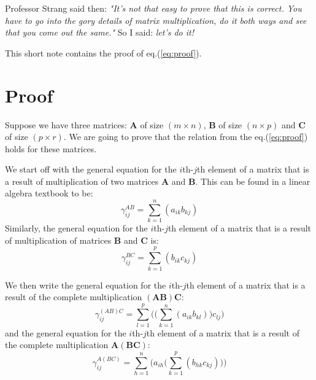 \documentclass[10pt,twocolumn]{article}
\begin{document}
Professor Strang said then: \textit{"It's not that easy to prove that this is correct. You have to go into the gory details of matrix multiplication, do it both ways and see that you come out the same."} So I said: \textit{let's do it!}

This short note contains the proof of eq.(\ref{eq:proof}).

\section*{Proof}

Suppose we have three matrices: $\bm{A}$ of size $(m \times n)$, $\bm{B}$ of size $(n \times p)$ and $\bm{C}$ of size $(p \times r)$. We are going to prove that the relation from the eq.(\ref{eq:proof}) holds for these matrices.

We start off with the general equation for the $i$th-$j$th element of a matrix that is a result of multiplication of two matrices $\bm{A}$ and $\bm{B}$. This can be found in a linear algebra textbook to be:
\begin{equation}
\gamma_{ij}^{AB} = \sum_{k=1}^{n} (a_{ik} b_{kj})
\end{equation}
Similarly, the general equation for the $i$th-$j$th element of a matrix that is a result of multiplication of matrices $\bm{B}$ and $\bm{C}$ is:
\begin{equation}
\gamma_{ij}^{BC} = \sum_{k=1}^{p} (b_{ik} c_{kj})
\end{equation}

We then write the general equation for the $i$th-$j$th element of a matrix that is a result of the complete multiplication $(\bm{A} \bm{B}) \bm{C}$:
\begin{equation} \label{eq:ab_c}
\gamma_{ij}^{(AB)C} = \sum_{l=1}^{p} \Big( \big( \sum_{k=1}^{n} (a_{ik} b_{kl}) \big) c_{lj} \Big)
\end{equation}
and the general equation for the $i$th-$j$th element of a matrix that is a result of the complete multiplication $\bm{A} (\bm{B} \bm{C})$:
\begin{equation} \label{eq:a_bc}
\gamma_{ij}^{A(BC)} = \sum_{h=1}^{n} \Big(  a_{ih} \big( \sum_{k=1}^{p} (b_{hk} c_{kj}) \big) \Big)
\end{equation}
\end{document}
